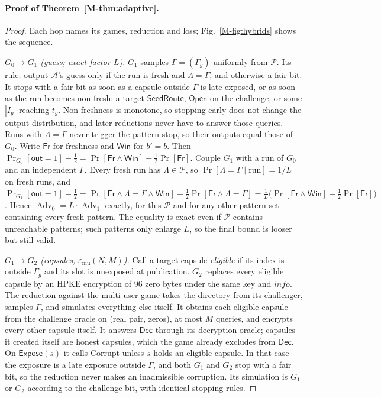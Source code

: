 \documentclass[pdflatex,sn-mathphys-num]{sn-jnl}
\theoremstyle{plain}
\newcommand{\Adv}{\operatorname{Adv}}
\begin{document}
\paragraph{Proof of Theorem~\ref{M-thm:adaptive}.}
\begin{proof}
Each hop names its games, reduction and loss; Fig.~\ref{M-fig:hybrids} shows the sequence.

\emph{$G_0\to G_1$ (guess; exact factor $L$).} $G_1$ samples $\Gamma=(\Gamma_g)$ uniformly from $\mathcal P$. Its rule: output $\mathcal A$'s guess only if the run is fresh and $\Lambda=\Gamma$, and otherwise a fair bit. It stops with a fair bit as soon as a capsule outside $\Gamma$ is late-exposed, or as soon as the run becomes non-fresh: a target $\mathsf{SeedRoute}$, $\mathsf{Open}$ on the challenge, or some $|I_g|$ reaching $t_g$. Non-freshness is monotone, so stopping early does not change the output distribution, and later reductions never have to answer those queries. Runs with $\Lambda=\Gamma$ never trigger the pattern stop, so their outputs equal those of $G_0$. Write $\mathsf{Fr}$ for freshness and $\mathsf{Win}$ for $b'=b$. Then $\Pr_{G_0}[\mathsf{out}=1]-\tfrac12=\Pr[\mathsf{Fr}\wedge \mathsf{Win}]-\tfrac12\Pr[\mathsf{Fr}]$. Couple $G_1$ with a run of $G_0$ and an independent $\Gamma$. Every fresh run has $\Lambda\in\mathcal P$, so $\Pr[\Lambda=\Gamma\mid\text{run}]=1/L$ on fresh runs, and
$\Pr_{G_1}[\mathsf{out}=1]-\tfrac12=\Pr[\mathsf{Fr}\wedge\Lambda{=}\Gamma\wedge \mathsf{Win}]-\tfrac12\Pr[\mathsf{Fr}\wedge\Lambda{=}\Gamma]=\tfrac1L\big(\Pr[\mathsf{Fr}\wedge \mathsf{Win}]-\tfrac12\Pr[\mathsf{Fr}]\big)$.
Hence $\Adv_0=L\cdot\Adv_1$ exactly, for this $\mathcal P$ and for any other pattern set containing every fresh pattern. The equality is exact even if $\mathcal P$ contains unreachable patterns; such patterns only enlarge $L$, so the final bound is looser but still valid.

\emph{$G_1\to G_2$ (capsules; $\varepsilon_{\mathrm{mu}}(N,M)$).} Call a target capsule \emph{eligible} if its index is outside $\Gamma_g$ and its slot is unexposed at publication. $G_2$ replaces every eligible capsule by an HPKE encryption of 96 zero bytes under the same key and $\mathit{info}$. The reduction against the multi-user game takes the directory from its challenger, samples $\Gamma$, and simulates everything else itself. It obtains each eligible capsule from the challenge oracle on (real pair, zeros), at most $M$ queries, and encrypts every other capsule itself. It answers $\mathsf{Dec}$ through its decryption oracle; capsules it created itself are honest capsules, which the game already excludes from $\mathsf{Dec}$. On $\mathsf{Expose}(s)$ it calls Corrupt unless $s$ holds an eligible capsule. In that case the exposure is a late exposure outside $\Gamma$, and both $G_1$ and $G_2$ stop with a fair bit, so the reduction never makes an inadmissible corruption. Its simulation is $G_1$ or $G_2$ according to the challenge bit, with identical stopping rules.


\end{proof}
\end{document}
